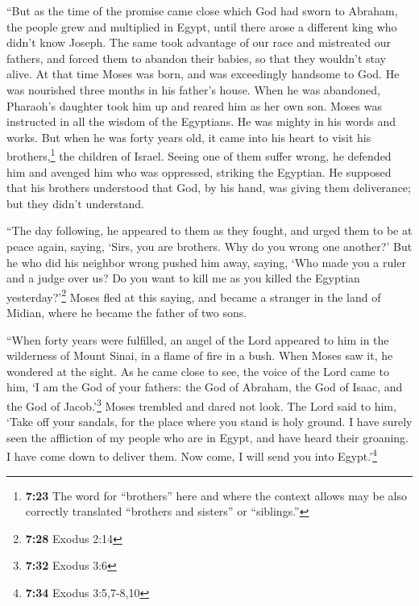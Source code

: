  ``But as the time of the promise came close which God
had sworn to Abraham, the people grew and multiplied in Egypt,
 until there arose a different king who didn't know
Joseph.  The same took advantage of our race and
mistreated our fathers, and forced them to abandon their babies, so that
they wouldn't stay alive.  At that time Moses was born,
and was exceedingly handsome to God. He was nourished three months in
his father's house.  When he was abandoned, Pharaoh's
daughter took him up and reared him as her own son. 
Moses was instructed in all the wisdom of the Egyptians. He was mighty
in his words and works.  But when he was forty years old,
it came into his heart to visit his brothers,\footnote{\textbf{7:23} The
  word for ``brothers'' here and where the context allows may be also
  correctly translated ``brothers and sisters'' or ``siblings.''} the
children of Israel.  Seeing one of them suffer wrong, he
defended him and avenged him who was oppressed, striking the Egyptian.
 He supposed that his brothers understood that God, by
his hand, was giving them deliverance; but they didn't understand.

 ``The day following, he appeared to them as they fought,
and urged them to be at peace again, saying, `Sirs, you are brothers.
Why do you wrong one another?'  But he who did his
neighbor wrong pushed him away, saying, `Who made you a ruler and a
judge over us?  Do you want to kill me as you killed the
Egyptian yesterday?'\footnote{\textbf{7:28} Exodus 2:14} 
Moses fled at this saying, and became a stranger in the land of Midian,
where he became the father of two sons.

 ``When forty years were fulfilled, an angel of the Lord
appeared to him in the wilderness of Mount Sinai, in a flame of fire in
a bush.  When Moses saw it, he wondered at the sight. As
he came close to see, the voice of the Lord came to him, 
`I am the God of your fathers: the God of Abraham, the God of Isaac, and
the God of Jacob.'\footnote{\textbf{7:32} Exodus 3:6} Moses trembled and
dared not look.  The Lord said to him, `Take off your
sandals, for the place where you stand is holy ground.  I
have surely seen the affliction of my people who are in Egypt, and have
heard their groaning. I have come down to deliver them. Now come, I will
send you into Egypt.'\footnote{\textbf{7:34} Exodus 3:5,7-8,10}

